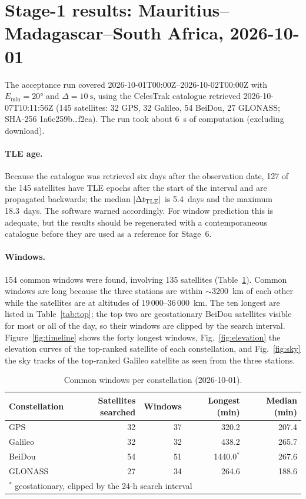 \documentclass[11pt,a4paper]{article}
\newcommand{\code}[1]{{\ttfamily\def\_{\textunderscore\allowbreak}#1}}
\begin{document}
\section{Stage-1 results: Mauritius--Madagascar--South Africa, 2026-10-01}

The acceptance run covered 2026-10-01T00:00Z--2026-10-02T00:00Z with
$E_{\min}=\ang{20}$ and $\Delta=\SI{10}{\second}$, using the CelesTrak
catalogue retrieved 2026-10-07T10:11:56Z (145 satellites: 32 GPS, 32
Galileo, 54 BeiDou, 27 GLONASS; SHA-256 \code{1a6c259b\dots f2ea}). The run
took about \SI{6}{\second} of computation (excluding download).

\paragraph{TLE age.} Because the catalogue was retrieved six days after the
observation date, 127 of the 145 satellites have TLE epochs after the start
of the interval and are propagated backwards; the median $|\Delta t_{\rm TLE}|$
is 5.4~days and the maximum 18.3~days. The software warned accordingly. For
window prediction this is adequate, but the results should be regenerated
with a contemporaneous catalogue before they are used as a reference for
Stage~6.

\paragraph{Windows.} 154 common windows were found, involving 135
satellites (Table~\ref{tab:constellations}). Common windows are long because
the three stations are within $\sim$\SI{3200}{\kilo\metre} of each other while
the satellites are at altitudes of 19\,000--36\,000~km. The ten longest are
listed in Table~\ref{tab:top}; the top two are geostationary BeiDou
satellites visible for most or all of the day, so their windows are clipped
by the search interval. Figure~\ref{fig:timeline} shows the forty longest
windows, Fig.~\ref{fig:elevation} the elevation curves of the top-ranked
satellite of each constellation, and Fig.~\ref{fig:sky} the sky tracks of
the top-ranked Galileo satellite as seen from the three stations.

\begin{table}[h]
\centering
\caption{Common windows per constellation (2026-10-01).}
\label{tab:constellations}
\small
\begin{tabular}{lrrrr}
\toprule
Constellation & Satellites searched & Windows & Longest (min) & Median (min)\\
\midrule
GPS     & 32 & 37 & 320.2  & 207.4\\
Galileo & 32 & 32 & 438.2  & 265.7\\
BeiDou  & 54 & 51 & 1440.0$^\ast$ & 267.6\\
GLONASS & 27 & 34 & 264.6  & 188.6\\
\bottomrule
\multicolumn{5}{l}{\footnotesize $^\ast$ geostationary, clipped by the 24-h search interval}
\end{tabular}
\end{table}
\end{document}
